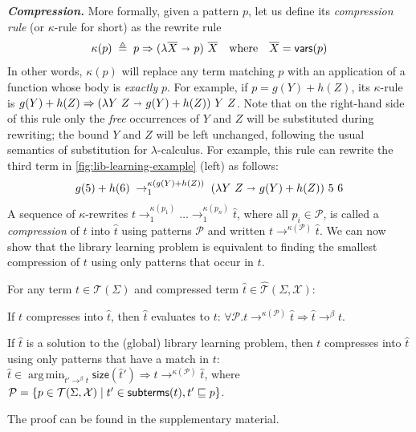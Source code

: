 \documentclass[acmsmall,screen,nonacm,review=false,timestamp=false]{acmart}
\newcommand{\emphbf}[1]{\emph{\textbf{#1}\xspace}}
\newcommand{\mypara}[1]{\smallskip\noindent\emphbf{#1.}\xspace}
\newcommand{\many}[1]{\overline{#1}}
\newcommand{\fv}{\mathsf{vars}}
\newcommand{\sz}{\mathsf{size}}
\newcommand{\termsof}[1]{\mathcal{T}(#1)}
\newcommand{\patsof}[2]{\mathcal{T}(#1,#2)}
\newcommand{\absof}[2]{\hat{\mathcal{T}}(#1,#2)}
\newcommand{\sub}{\sqsubseteq}
\newcommand{\bnd}{\ \mathbf{\shortrightarrow}\ }
\newcommand{\rwsteps}[1]{\rightarrow^{#1}_1}
\newcommand{\rewrites}[1]{\rightarrow^{#1}}
\newcommand{\evals}{\rewrites{\beta}}
\DeclareMathOperator*{\argmin}{arg\,min}
\newcommand{\patset}{\mathcal{P}}
\begin{document}
\mypara{Compression}
More formally, given a pattern $p$,
let us define its \emph{compression rule} (or $\kappa$-rule for short)
as the rewrite rule
\[
  \kappa(p) \; \triangleq \; p \Rightarrow (\lambda \many{X} \bnd p)\ \many{X} \quad \text{where}\quad \many{X} = \fv(p)
\]
In other words, $\kappa(p)$ will replace any term 
matching $p$ with an application of a function whose body is \emph{exactly} $p$.
For example, if $p = g(Y) + h(Z)$,
its $\kappa$-rule is $g(Y) + h(Z) \Rightarrow (\lambda Y\ Z \bnd g(Y) + h(Z))\ Y\ Z$.
Note that on the right-hand side of this rule 
only the \emph{free} occurrences of $Y$ and $Z$ will be substituted during rewriting;
the bound $Y$ and $Z$ will be left unchanged, following the usual semantics of substitution for $\lambda$-calculus.
For example, this rule can rewrite the third term in \autoref{fig:lib-learning-example} (left) as follows:
\[
  g(5) + h(6) \;\rwsteps{\kappa(g(Y) + h(Z))}\; (\lambda Y\ Z \bnd g(Y) + h(Z))\ 5\ 6
\]
A sequence of $\kappa$-rewrites $t \rwsteps{\kappa(p_1)} \dots \rwsteps{\kappa(p_n)} \hat{t}$,
where all $p_i \in \patset$, 
is called a \emph{compression} of $t$ into $\hat{t}$ using patterns $\patset$
and written $t \rewrites{\kappa(\patset)} \hat{t}$.
We can now show that the library learning problem is equivalent to finding the smallest compression of $t$
using only patterns that occur in $t$.

\begin{theorem}
  For any term $t \in \termsof{\Sigma}$ and compressed term $\hat{t} \in \absof{\Sigma}{\mathcal{X}}$:
  \begin{description}[font=\itshape]
    \item[(Soundness)] If $t$ compresses into $\hat{t}$, then $\hat{t}$ evaluates to $t$: $\forall \patset . t \rewrites{\kappa(\patset)} \hat{t} \Longrightarrow \hat{t} \evals t$.
    \item[(Completeness)] If $\hat{t}$ is a solution to the (global) library learning problem, 
    then $t$ compresses into $\hat{t}$ using only patterns that have a match in $t$:
    $\hat{t} \in \argmin_{\hat{t}' \evals t} \sz(\hat{t}') \Longrightarrow t \rewrites{\kappa(\patset)} \hat{t}$, 
    where $\patset = \{p \in \patsof{\Sigma}{\mathcal{X}} \mid t' \in \subterms(t) , t' \sub p\}$.
  \end{description}
\label{thm:pat-lib-learning}
\end{theorem} 
The proof can be found in the supplementary material. 
\end{document}
